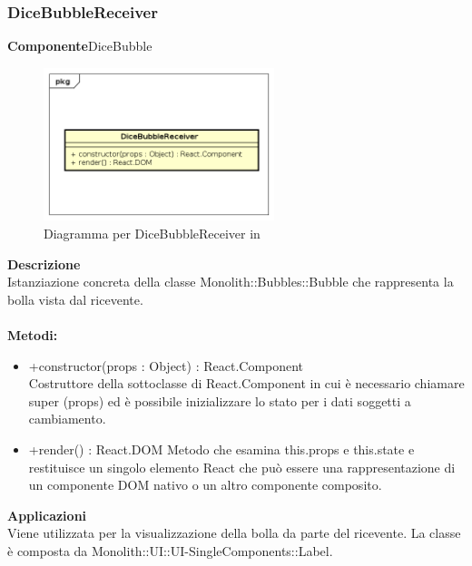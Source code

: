 \clearpage

\subsubsection{DiceBubbleReceiver}
\textbf{Componente}DiceBubble\\
   \FloatBarrier
   \begin{figure}[ht]
   \centering
   \includegraphics[width=0.6\textwidth]{img/single-DiceBubbleReceiver}
   \caption{{Diagramma per DiceBubbleReceiver in }}
\end{figure}
\FloatBarrier
\textbf{Descrizione}\\
Istanziazione concreta della classe Monolith::Bubbles::Bubble che rappresenta la bolla vista dal ricevente.
\\
\\
\textbf{Metodi:} 
\begin{itemize}
\item +constructor(props : Object) : React.Component 
\\
Costruttore della sottoclasse di React.Component in cui è necessario chiamare super (props) ed è possibile inizializzare lo stato per i dati soggetti a cambiamento.

\item +render() : React.DOM
Metodo che esamina this.props e this.state e restituisce un singolo elemento React che può essere una rappresentazione di un componente DOM nativo o un altro componente composito.

\end{itemize} 


\textbf{Applicazioni}\\
Viene utilizzata per la visualizzazione della bolla da parte del ricevente.
La classe è composta da Monolith::UI::UI-SingleComponents::Label. 


\clearpage


